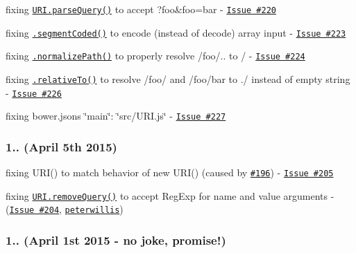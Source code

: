 \begin{DoxyItemize}
\item fixing \href{http://medialize.github.io/URI.js/docs.html#static-parseQuery}{\tt {\ttfamily U\+R\+I.\+parse\+Query()}} to accept {\ttfamily ?foo\&foo=bar} -\/ \href{https://github.com/medialize/URI.js/issues/220}{\tt Issue \#220}
\item fixing \href{http://medialize.github.io/URI.js/docs.html#accessors-segmentCoded}{\tt {\ttfamily .segment\+Coded()}} to encode (instead of decode) array input -\/ \href{https://github.com/medialize/URI.js/issues/223}{\tt Issue \#223}
\item fixing \href{http://medialize.github.io/URI.js/docs.html#normalize-path}{\tt {\ttfamily .normalize\+Path()}} to properly resolve {\ttfamily /foo/..} to {\ttfamily /} -\/ \href{https://github.com/medialize/URI.js/issues/224}{\tt Issue \#224}
\item fixing \href{http://medialize.github.io/URI.js/docs.html#relativeto}{\tt {\ttfamily .relative\+To()}} to resolve {\ttfamily /foo/} and {\ttfamily /foo/bar} to {\ttfamily ./} instead of empty string -\/ \href{https://github.com/medialize/URI.js/issues/226}{\tt Issue \#226}
\item fixing {\ttfamily bower.\+json}\textquotesingle{}s {\ttfamily \char`\"{}main\char`\"{}\+: \char`\"{}src/\+U\+R\+I.\+js\char`\"{}} -\/ \href{https://github.com/medialize/URI.js/issues/227}{\tt Issue \#227}
\end{DoxyItemize}

\subsubsection*{1.. (April 5th 2015)}


\begin{DoxyItemize}
\item fixing {\ttfamily U\+R\+I()} to match behavior of {\ttfamily new U\+R\+I()} (caused by \href{https://github.com/medialize/URI.js/issues/196}{\tt \#196}) -\/ \href{https://github.com/medialize/URI.js/issues/205}{\tt Issue \#205}
\item fixing \href{http://medialize.github.io/URI.js/docs.html#search-remove}{\tt {\ttfamily U\+R\+I.\+remove\+Query()}} to accept Reg\+Exp for name and value arguments -\/ (\href{https://github.com/medialize/URI.js/issues/204}{\tt Issue \#204}, \href{https://github.com/peterwillis}{\tt peterwillis})
\end{DoxyItemize}

\subsubsection*{1.. (April 1st 2015 -\/ no joke, promise!)}


